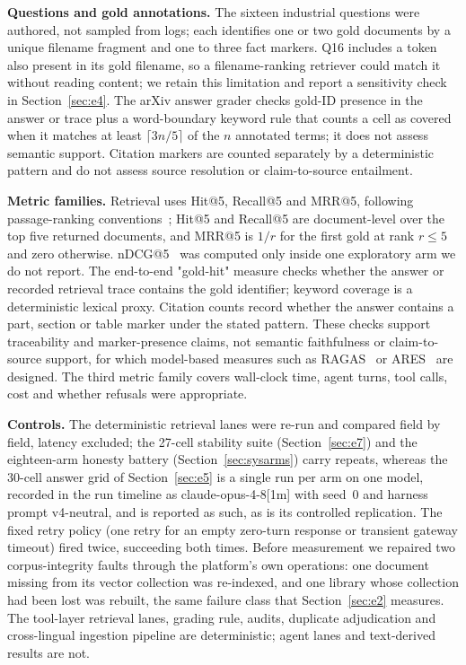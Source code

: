 \textbf{Questions and gold annotations.} The sixteen industrial questions were
authored, not sampled from logs; each identifies one or two gold documents by
a unique filename fragment and one to three fact markers. Q16 includes a token
also present in its gold filename, so a filename-ranking retriever could match
it without reading content; we retain this limitation and report a sensitivity
check in Section~\ref{sec:e4}. The arXiv answer grader
checks gold-ID presence in the answer or trace plus a word-boundary keyword
rule that counts a cell as covered when it matches at least $\lceil 3n/5\rceil$
of the $n$ annotated terms; it does not assess semantic support. Citation
markers are counted separately by a deterministic pattern and do not assess
source resolution or claim-to-source entailment.

\textbf{Metric families.} Retrieval uses Hit@5, Recall@5 and MRR@5, following
passage-ranking conventions~\cite{craswell-msmarco-2021}; Hit@5 and Recall@5
are document-level over the top five returned documents, and MRR@5 is $1/r$
for the first gold at rank $r\le 5$ and zero otherwise.
nDCG@5~\cite{jarvelin-cumulated-gain-2002} was computed only inside one
exploratory arm we do not report. The end-to-end "gold-hit" measure checks
whether the answer or recorded retrieval trace contains the gold identifier;
keyword coverage is a deterministic lexical proxy. Citation counts record
whether the answer contains a part, section or table marker under the stated
pattern. These checks support traceability and marker-presence claims, not
semantic faithfulness or claim-to-source support, for which model-based
measures such as RAGAS~\cite{es-ragas-2024} or ARES~\cite{saad-falcon-ares-2024}
are designed. The third metric family covers wall-clock time, agent turns,
tool calls, cost and whether refusals were appropriate.

\textbf{Controls.} The deterministic retrieval lanes were re-run and compared
field by field, latency excluded; the 27-cell stability suite
(Section~\ref{sec:e7}) and the eighteen-arm honesty battery
(Section~\ref{sec:sysarms}) carry repeats, whereas the 30-cell answer grid of
Section~\ref{sec:e5} is a single run per arm on one model, recorded in the run
timeline as claude-opus-4-8[1m] with seed~0 and harness prompt v4-neutral, and
is reported as such, as is its controlled replication. The fixed retry
policy (one retry for
an empty zero-turn response or transient gateway timeout) fired twice,
succeeding both times. Before measurement we repaired two corpus-integrity
faults through the platform's own operations: one document missing from its
vector collection was re-indexed, and one library whose collection had been
lost was rebuilt, the same failure class that Section~\ref{sec:e2} measures. The tool-layer
retrieval lanes, grading rule, audits, duplicate adjudication and cross-lingual
ingestion pipeline are deterministic; agent lanes and text-derived results are
not.

